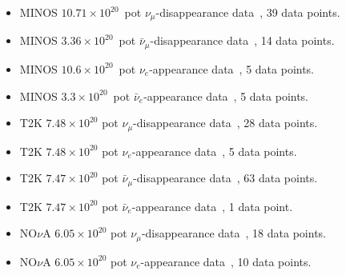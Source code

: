 \documentclass[a4paper, 11pt]{article}
\begin{document}
\begin{itemize}
  \setlength{\itemsep}{0mm}
\item MINOS $10.71\times 10^{20}$~pot $\nu_\mu$-disappearance
  data~\cite{Adamson:2013whj}, 39 data points.

\item MINOS $3.36\times 10^{20}$~pot $\bar\nu_\mu$-disappearance
  data~\cite{Adamson:2013whj}, 14 data points.

\item MINOS $10.6\times 10^{20}$~pot $\nu_e$-appearance
  data~\cite{Adamson:2013ue}, 5 data points.

\item MINOS $3.3\times 10^{20}$~pot $\bar\nu_e$-appearance
  data~\cite{Adamson:2013ue}, 5 data points.

\item T2K $7.48\times 10^{20}$ pot $\nu_\mu$-disappearance
  data~\cite{t2k:ichep2016, t2k:susy2016}, 28 data points.

\item T2K $7.48\times 10^{20}$ pot $\nu_e$-appearance
  data~\cite{t2k:ichep2016, t2k:susy2016}, 5 data points.

\item T2K $7.47\times 10^{20}$ pot $\bar\nu_\mu$-disappearance
  data~\cite{t2k:ichep2016, t2k:susy2016}, 63 data points.

\item T2K $7.47\times 10^{20}$ pot $\bar\nu_e$-appearance
  data~\cite{t2k:ichep2016, t2k:susy2016}, 1 data point.

\item NO$\nu$A $6.05\times 10^{20}$ pot $\nu_\mu$-disappearance
  data~\cite{nova:nu2016}, 18 data points.

\item NO$\nu$A $6.05\times 10^{20}$ pot $\nu_e$-appearance
  data~\cite{nova:nu2016}, 10 data points.
\end{itemize}



\end{document}
